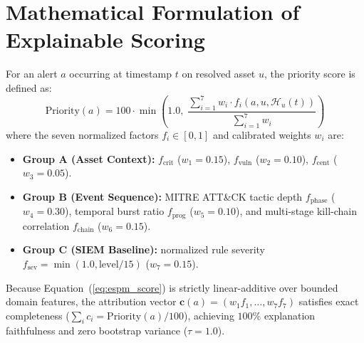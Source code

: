 \section{Mathematical Formulation of Explainable Scoring}
For an alert $a$ occurring at timestamp $t$ on resolved asset $u$, the priority score is defined as:
\begin{equation}
    \text{Priority}(a) = 100 \cdot \min\left(1.0,\; \frac{\sum_{i=1}^{7} w_i \cdot f_i(a, u, \mathcal{H}_u(t))}{\sum_{i=1}^{7} w_i}\right)
    \label{eq:espm_score}
\end{equation}
where the seven normalized factors $f_i \in [0, 1]$ and calibrated weights $w_i$ are:
\begin{itemize}
    \item \textbf{Group A (Asset Context):} $f_{\text{crit}}$ ($w_1=0.15$), $f_{\text{vuln}}$ ($w_2=0.10$), $f_{\text{cent}}$ ($w_3=0.05$).
    \item \textbf{Group B (Event Sequence):} MITRE ATT\&CK tactic depth $f_{\text{phase}}$ ($w_4=0.30$), temporal burst ratio $f_{\text{prog}}$ ($w_5=0.10$), and multi-stage kill-chain correlation $f_{\text{chain}}$ ($w_6=0.15$).
    \item \textbf{Group C (SIEM Baseline):} normalized rule severity $f_{\text{sev}} = \min(1.0, \text{level}/15)$ ($w_7=0.15$).
\end{itemize}
Because Equation~(\ref{eq:espm_score}) is strictly linear-additive over bounded domain features, the attribution vector $\mathbf{c}(a) = (w_1 f_1, \dots, w_7 f_7)$ satisfies exact completeness ($\sum_i c_i = \text{Priority}(a)/100$), achieving $100\%$ explanation faithfulness and zero bootstrap variance ($\tau = 1.0$).
